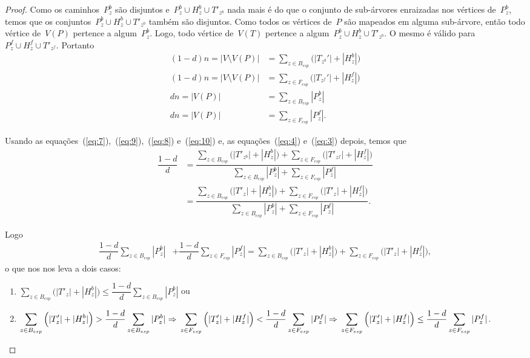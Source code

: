 \begin{proof}
	Como os caminhos~$P^b_z$ são disjuntos e~$P^b_z\cup H^b_z\cup T'_{z^b}$
	nada mais é do que o conjunto de sub-árvores enraizadas
	nos vértices de~$P^b_z$, temos 
	que os conjuntos~${P^b_z\cup H^b_z\cup T'_{z^b}}$ também são disjuntos.
	Como todos os vértices de~$P$ são mapeados em alguma sub-árvore,
	então todo vértice de~$V(P)$ pertence a algum~$P^b_z$.
	Logo,
	todo vértice de~$V(T)$ pertence a 
	algum~${P^b_z\cup H^b_z\cup T'_{z^b}}$.
	O mesmo é válido para~${P^f_z\cup H^f_z\cup T'_{z^f}}$.
	Portanto
	\begin{align}
		(1-d)n = |V\setminus V(P)| &= 
		\displaystyle\sum_{z\in B_{esp}}\Big(|T_{z^b}'|+|H_z^b|\Big)
		\label{eq:7}\\
		(1-d)n = |V\setminus V(P)| &= 
		\displaystyle\sum_{z\in F_{esp}}\Big(|T_{z^f}'|+|H_z^f|\Big)
		\label{eq:9}\\
		dn = |V(P)| &= 
		\displaystyle\sum_{z\in B_{esp}}|P_z^b|
		\label{eq:8}\\
		dn = |V(P)| &= 
		\displaystyle\sum_{z\in F_{esp}}|P_z^f| 
		\label{eq:10}.
	\end{align}

	Usando as equações~(\ref{eq:7}),~(\ref{eq:9}),~(\ref{eq:8}) e~(\ref{eq:10})
	e, as equações~(\ref{eq:4}) e~(\ref{eq:3}) depois, temos que
	\begin{align}
		\dfrac{1-d}{d} &= 
		\dfrac{
			\displaystyle\sum_{z\in B_{esp}}
			\Big(|T'_{z^b}|+|H_z^b|\Big) + 
			\displaystyle\sum_{z\in F_{esp}}
			\Big(|T'_{z^f}|+|H_z^f|\Big)}
			{\displaystyle\sum_{z\in B_{esp}}|P_z^b| +
			\displaystyle\sum_{z\in F_{esp}}|P_z^f|}
			\nonumber\\
		&= \dfrac{
			\displaystyle\sum_{z\in B_{esp}}
			\Big(|T'_{z}|+|H_z^b|\Big) + 
			\displaystyle\sum_{z\in F_{esp}}
			\Big(|T'_{z}|+|H_z^f|\Big)}
			{\displaystyle\sum_{z\in B_{esp}}|P_z^b| +
			\displaystyle\sum_{z\in F_{esp}}|P_z^f|}.
			\nonumber
	\end{align}
			
			Logo
	\begin{align}
			\dfrac{1-d}{d}\displaystyle\sum_{z\in B_{esp}}|P_z^b| &+ 
			\dfrac{1-d}{d}\displaystyle\sum_{z\in F_{esp}}|P_z^f|
			= \displaystyle\sum_{z\in B_{esp}}
			\Big(|T'_{z}|+|H_z^b|\Big) + 
			\displaystyle\sum_{z\in F_{esp}}
			\Big(|T'_{z}|+|H_z^f|\Big),\nonumber
	\end{align}
	o que nos nos leva a dois casos:
	\begin{enumerate}[label=(\Roman*)]   %
		\item $\displaystyle\sum_{z\in B_{esp}}
			\Big(|T'_{z}|+|H_z^b|\Big)\le
			\dfrac{1-d}{d}\displaystyle\sum_{z\in B_{esp}}|P_z^b|$
			ou
		\item $\displaystyle\sum_{z\in B_{esp}}
			\Big(|T'_{z}|+|H_z^b|\Big)>
			\dfrac{1-d}{d}\displaystyle\sum_{z\in B_{esp}}|P_z^b|
			\Rightarrow \\
			\displaystyle\sum_{z\in F_{esp}}
			\Big(|T'_{z}|+|H_z^f|\Big)<
			\dfrac{1-d}{d}\displaystyle\sum_{z\in F_{esp}}|P_z^f|
			\Rightarrow \\
			\displaystyle\sum_{z\in F_{esp}}
			\Big(|T'_{z}|+|H_z^f|\Big)\le
			\dfrac{1-d}{d}\displaystyle\sum_{z\in F_{esp}}|P_z^f|$.
	\end{enumerate}


\end{proof}
